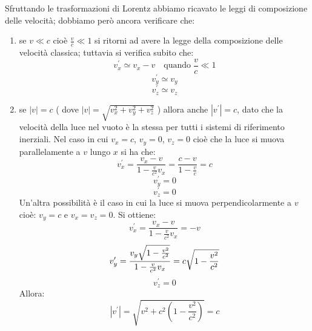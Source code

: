 \begin{osservazione}
  Sfruttando le trasformazioni di Lorentz abbiamo ricavato le leggi di
  composizione delle velocit\`a; dobbiamo per\`o ancora verificare
  che:
  \begin{enumerate}
  \item se $v\ll c$ cio\`e $\frac{v}{c}\ll 1$ si ritorni ad avere la
    legge della composizione delle velocit\`a classica; tuttavia si
    verifica subito che:
    \begin{displaymath}
      v^{\prime}_{x}\simeq v_{x}-v\quad\textrm{quando}\;\frac{v}{c}\ll 1
    \end{displaymath}
    \begin{displaymath}
      v^{\prime}_{y}\simeq v_{y}
    \end{displaymath}
    \begin{displaymath}
      v^{\prime}_{z}\simeq v_{z}
    \end{displaymath}
  \item se $|v|=c$ ( dove $|v|=\sqrt{v_{x}^{2}+v_{y}^{2}+v_{z}^{2}}$ )
    allora anche $|v^{\prime}|=c$, dato che la velocit\`a della luce
    nel vuoto \`e la stessa per tutti i sistemi di riferimento
    inerziali. Nel caso in cui $v_{x}=c$, $v_{y}=0$, $v_{z}=0$ cio\`e
    che la luce si muova parallelamente a $v$ lungo $x$ si ha che:
    \begin{displaymath}
      v_{x}^{\prime} = 
      \frac{v_{x}-v}{1-\frac{v}{c^{2}}v_{x}}=\frac{c-v}{1-\frac{v}{c}}=c
    \end{displaymath}
    \begin{displaymath}
      v_{y}^{\prime}=0
    \end{displaymath}
    \begin{displaymath}
      v_{z}^{\prime}=0
    \end{displaymath}
    Un'altra possibilit\`a \`e il caso in cui la luce si muova
    perpendicolarmente a $v$ cio\`e: $v_{y}=c$ e $v_{x}=v_{z}=0$. Si
    ottiene:
    \begin{displaymath}
      v_{x}^{\prime}=\frac{v_{x}-v}{1-\frac{v}{c^{2}}v_{x}}=-v
    \end{displaymath}
    \begin{displaymath}
      v_{y}^{\prime}=\frac{v_{y}\sqrt{1-\frac{v^{2}}{c^{2}}}}{1-\frac{v}{c^{2}}v_{x}}=c\sqrt{1-\frac{v^{2}}{c^{2}}}
    \end{displaymath}
    \begin{displaymath}
      v_{z}^{\prime}=0
    \end{displaymath}
    Allora:
    \begin{displaymath}
      | v^{\prime}|=\sqrt{v^{2}+c^{2}(1-\frac{v^{2}}{c^{2}})}=c
    \end{displaymath}
  \end{enumerate}
\end{osservazione}
